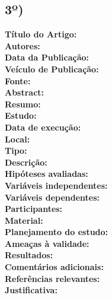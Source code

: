 \documentclass[12pt,a4paper]{article}
\begin{document}
\subsection*{3º)}
\noindent \textbf{Título do Artigo:} \hrulefill \\
\textbf{Autores:} \hrulefill \\
\textbf{Data da Publicação:} \hrulefill \\
\textbf{Veículo de Publicação:} \hrulefill \\
\textbf{Fonte:} \hrulefill \\
\textbf{Abstract:} \hrulefill \\
\textbf{Resumo:} \hrulefill \\
\textbf{Estudo:} \hrulefill \\
\textbf{Data de execução:} \hrulefill \\
\textbf{Local:} \hrulefill \\
\textbf{Tipo:} \hrulefill \\
\textbf{Descrição:} \hrulefill \\
\textbf{Hipóteses avaliadas:} \hrulefill \\
\textbf{Variáveis independentes:} \hrulefill \\
\textbf{Variáveis dependentes:} \hrulefill \\
\textbf{Participantes:} \hrulefill \\
\textbf{Material:} \hrulefill \\
\textbf{Planejamento do estudo:} \hrulefill \\
\textbf{Ameaças à validade:} \hrulefill \\
\textbf{Resultados:} \hrulefill \\
\textbf{Comentários adicionais:} \hrulefill \\
\textbf{Referências relevantes:} \hrulefill \\
\textbf{Justificativa:} \hrulefill

\vspace{1cm}
\end{document}
